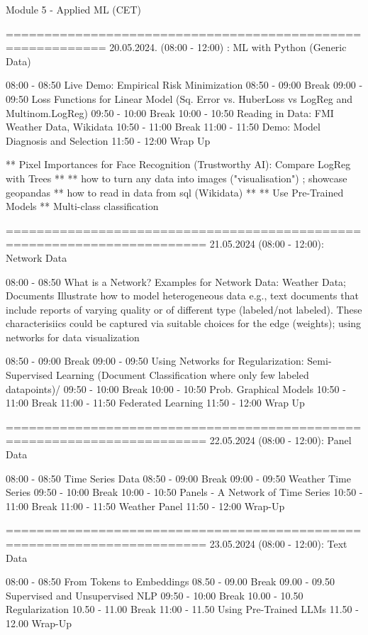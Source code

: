Module 5 - Applied ML		(CET)

===========================================================
20.05.2024. (08:00 - 12:00) : ML with Python (Generic Data)  

08:00 - 08:50 Live Demo: Empirical Risk Minimization 
08:50 - 09:00 Break 
09:00 - 09:50 Loss Functions for Linear Model (Sq. Error vs. HuberLoss vs LogReg and Multinom.LogReg) 
09:50 - 10:00 Break 
10:00 - 10:50 Reading in Data: FMI Weather Data, Wikidata
10:50 - 11:00 Break 
11:00 - 11:50 Demo: Model Diagnosis and Selection
11:50 - 12:00 Wrap Up 


** Pixel Importances for Face Recognition (Trustworthy AI): Compare LogReg with Trees 
** 
** how to turn any data into images ("visualisation") ; showcase geopandas
** how to read in data from sql (Wikidata) 
** 
** Use Pre-Trained Models 
** Multi-class classification 

========================================================================
21.05.2024 (08:00 - 12:00): Network Data 

08:00 - 08:50 What is a Network? Examples for Network Data:  Weather Data; Documents 
Illustrate how to model heterogeneous data e.g., text documents that include reports of varying quality or of different type (labeled/not labeled). These 
characterisiics could be captured via suitable choices for the edge (weights); using networks for data visualization

08:50 - 09:00 Break 
09:00 - 09:50 Using Networks for Regularization: Semi-Supervised Learning (Document Classification where only few labeled datapoints)/ 
09:50 - 10:00 Break 
10:00 - 10:50 Prob. Graphical Models 
10:50 - 11:00 Break 
11:00 - 11:50 Federated Learning
11:50 - 12:00 Wrap Up  

========================================================================
22.05.2024 (08:00 - 12:00): Panel Data 

08:00 - 08:50 Time Series Data 
08:50 - 09:00 Break 
09:00 - 09:50 Weather Time Series 
09:50 - 10:00 Break 
10:00 - 10:50 Panels - A Network of Time Series 
10:50 - 11:00 Break 
11:00 - 11:50 Weather Panel 
11:50 - 12:00 Wrap-Up


========================================================================
23.05.2024 (08:00 - 12:00): Text Data 

08:00 - 08:50 From Tokens to Embeddings 
08.50 - 09.00 Break
09.00 - 09.50 Supervised and Unsupervised NLP   
09:50 - 10:00 Break 
10.00 - 10.50 Regularization 
10.50 - 11.00 Break 
11:00 - 11.50 Using Pre-Trained LLMs
11.50 - 12.00 Wrap-Up 

